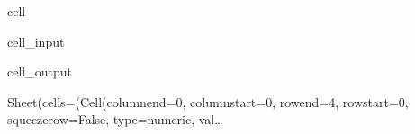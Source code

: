 \documentclass[letterpaper,10pt,english]{jupyterBook}
\begin{document}
\begin{sphinxuseclass}{cell}
\begin{sphinxVerbatimInput}
\begin{sphinxuseclass}{cell_input}
\end{sphinxuseclass}\end{sphinxVerbatimInput}
\begin{sphinxVerbatimOutput}

\begin{sphinxuseclass}{cell_output}
\begin{sphinxVerbatim}[commandchars=\\\{\}]
Sheet(cells=(Cell(column\PYGZus{}end=0, column\PYGZus{}start=0, row\PYGZus{}end=4, row\PYGZus{}start=0, squeeze\PYGZus{}row=False, type=\PYGZsq{}numeric\PYGZsq{}, val…
\end{sphinxVerbatim}

\end{sphinxuseclass}\end{sphinxVerbatimOutput}

\end{sphinxuseclass}
\end{document}
